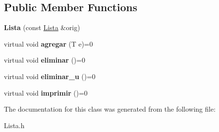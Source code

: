 \subsection*{Public Member Functions}
\begin{DoxyCompactItemize}
\item 
\hypertarget{class_lista_ad63a49df32595e2f321fffd7ffa1346a}{{\bfseries Lista} (const \hyperlink{class_lista}{Lista} \&orig)}\label{class_lista_ad63a49df32595e2f321fffd7ffa1346a}

\item 
\hypertarget{class_lista_aea57814c283f14cd0d31b8da37c622a9}{virtual void {\bfseries agregar} (T e)=0}\label{class_lista_aea57814c283f14cd0d31b8da37c622a9}

\item 
\hypertarget{class_lista_aabdd833f1bc38b8174838f92c5b438b3}{virtual void {\bfseries eliminar} ()=0}\label{class_lista_aabdd833f1bc38b8174838f92c5b438b3}

\item 
\hypertarget{class_lista_aa0da522793d55d38f5ba1faf4354b1df}{virtual void {\bfseries eliminar\+\_\+u} ()=0}\label{class_lista_aa0da522793d55d38f5ba1faf4354b1df}

\item 
\hypertarget{class_lista_af398229330911af031fc1d89a556a840}{virtual void {\bfseries imprimir} ()=0}\label{class_lista_af398229330911af031fc1d89a556a840}

\end{DoxyCompactItemize}


The documentation for this class was generated from the following file\+:\begin{DoxyCompactItemize}
\item 
Lista.\+h\end{DoxyCompactItemize}

